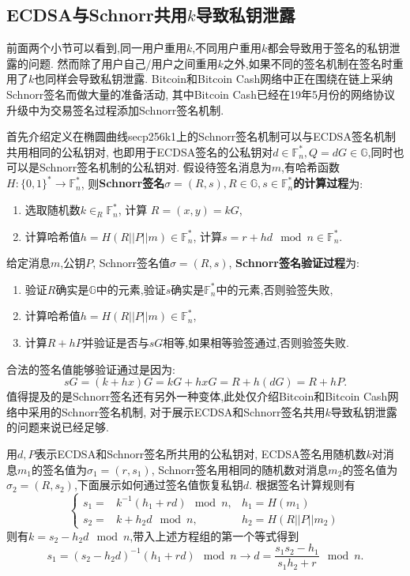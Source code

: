 \documentclass{article}
\renewcommand{\G}{\mathbb{G}}
\newcommand{\F}{\mathbb{F}}
\begin{document}
\subsection{ECDSA与Schnorr共用$k$导致私钥泄露}

前面两个小节可以看到,同一用户重用$k$,不同用户重用$k$都会导致用于签名的私钥泄露的问题.
然而除了用户自己/用户之间重用$k$之外,如果不同的签名机制在签名时重用了$k$也同样会导致私钥泄露.
Bitcoin和Bitcoin Cash网络中正在围绕在链上采纳Schnorr签名而做大量的准备活动,
其中Bitcoin Cash已经在19年5月份的网络协议升级中为交易签名过程添加Schnorr签名机制.

首先介绍定义在椭圆曲线secp256k1上的Schnorr签名机制可以与ECDSA签名机制共用相同的公私钥对,
也即用于ECDSA签名的公私钥对$d\in\F_n^*, Q=dG\in\G$,同时也可以是Schnorr签名机制的公私钥对.
假设待签名消息为$m$,有哈希函数$H: \{0,1\}^*\rightarrow \F_n^*$, 
则\textbf{Schnorr签名$\sigma=(R,s), R\in \G, s\in\F_n^*$的计算过程}为:
\begin{enumerate}
\item 选取随机数$k\in_R\F_n^*$, 计算 $R=(x,y)=kG$,
\item 计算哈希值$h = H(R||P||m)\in\F_n^*$, 计算$s=r+hd \mod n \in \F_n^*$.
\end{enumerate}
给定消息$m$,公钥$P$, Schnorr签名值$\sigma=(R,s)$, \textbf{Schnorr签名验证过程}为:
\begin{enumerate}
\item 验证$R$确实是$\G$中的元素,验证$s$确实是$\F_n^*$中的元素,否则验签失败,
\item 计算哈希值$h = H(R||P||m)\in\F_n^*$,
\item 计算$R+hP$并验证是否与$sG$相等,如果相等验签通过,否则验签失败.
\end{enumerate}
合法的签名值能够验证通过是因为:
$$
sG = (k+hx)G = kG + hxG = R + h(dG) = R + hP.
$$
值得提及的是Schnorr签名还有另外一种变体,此处仅介绍Bitcoin和Bitcoin Cash网络中采用的Schnorr签名机制,
对于展示ECDSA和Schnorr签名共用$k$导致私钥泄露的问题来说已经足够.

用$d, P$表示ECDSA和Schnorr签名所共用的公私钥对, ECDSA签名用随机数$k$对消息$m_1$的签名值为$\sigma_1 = (r, s_1)$,
Schnorr签名用相同的随机数对消息$m_2$的签名值为$\sigma_2 = (R, s_2)$,下面展示如何通过签名值恢复私钥$d$.
根据签名计算规则有
\begin{equation}\nonumber
\left\{
\begin{array}{lll}
s_1 = & k^{-1}(h_1 + rd) \mod n, & h_1 = H(m_1)\\
s_2 = & k + h_2d \mod n, & h_2 = H(R||P||m_2)
\end{array}
\right.
\end{equation}
则有$k = s_2 - h_2d\mod n$,带入上述方程组的第一个等式得到
$$
s_1 =  (s_2 - h_2d)^{-1}(h_1 + rd) \mod n \rightarrow d = \dfrac{s_1s_2 - h_1}{s_1h_2 + r} \mod n.
$$
\end{document}
